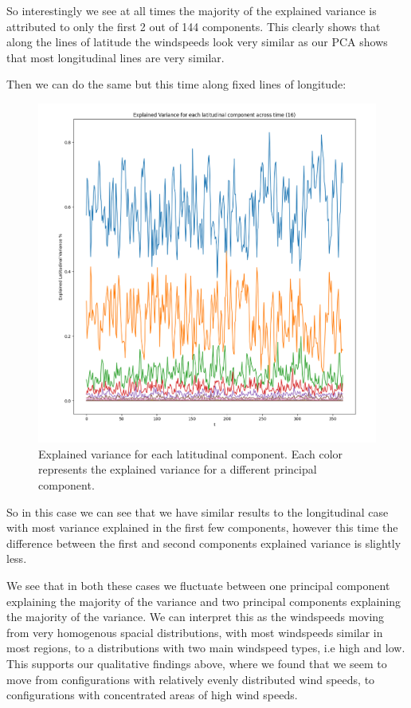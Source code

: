 \documentclass[a4paper, oneside]{book}
\begin{document}
So interestingly we see at all times the majority of the explained variance is attributed
to only the first 2 out of 144 components. This clearly shows that along the lines of latitude
the windspeeds look very similar as our PCA shows that most longitudinal lines are very similar.

Then we can do the same but this time along fixed lines of longitude:

\begin{figure}[htpb]
    \centering
    \includegraphics[width=1.0\textwidth]{./images/Pasted image 20231205164854.png}
    \caption{Explained variance for each latitudinal component. Each color represents
    the explained variance for a different principal component.}
\end{figure}

So in this case we can see that we have similar results to the longitudinal case
with most variance explained in the first few components, however this time the
difference between the first and second components explained variance is slightly less.

We see that in both these cases we fluctuate between one principal component
explaining the majority of the variance and two principal components explaining
the majority of the variance. We can interpret this as the windspeeds 
moving from very homogenous spacial distributions, with most windspeeds
similar in most regions, to a distributions with two main windspeed types,
i.e high and low.
This supports our qualitative findings above, where we found that we seem to
move from configurations with relatively evenly distributed wind speeds,
to configurations with concentrated areas of high wind speeds.
\clearpage
\end{document}
